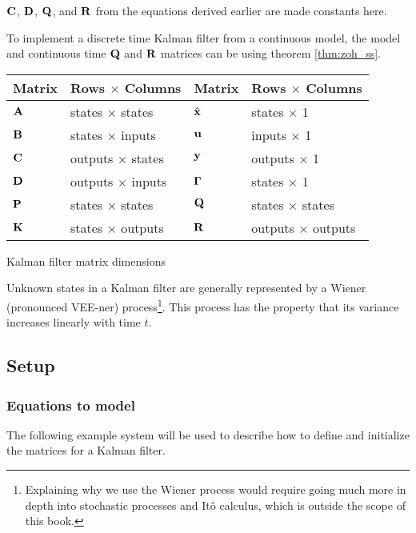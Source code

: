 $\mathbf{C}$, $\mathbf{D}$, $\mathbf{Q}$, and $\mathbf{R}$ from the equations derived
earlier are made constants here.
\begin{remark}
  To implement a discrete time Kalman filter from a continuous model, the model
  and continuous time $\mathbf{Q}$ and $\mathbf{R}$ matrices can be
   using theorem \ref{thm:zoh_ss}.
\end{remark}
\begin{booktable}
  \begin{tabular}{|ll|ll|}
    \hline
    \rowcolor{headingbg}
    \textbf{Matrix} & \textbf{Rows $\times$ Columns} &
    \textbf{Matrix} & \textbf{Rows $\times$ Columns} \\
    \hline
    $\mathbf{A}$ & states $\times$ states & $\hat{\mathbf{x}}$ & states $\times$ 1 \\
    $\mathbf{B}$ & states $\times$ inputs & $\mathbf{u}$ & inputs $\times$ 1 \\
    $\mathbf{C}$ & outputs $\times$ states & $\mathbf{y}$ & outputs $\times$ 1 \\
    $\mathbf{D}$ & outputs $\times$ inputs & $\mathbf{\Gamma}$ & states $\times$ 1 \\
    $\mathbf{P}$ & states $\times$ states & $\mathbf{Q}$ & states $\times$ states \\
    $\mathbf{K}$ & states $\times$ outputs & $\mathbf{R}$ & outputs $\times$ outputs
      \\
    \hline
  \end{tabular}
  \caption{Kalman filter matrix dimensions}
\end{booktable}

Unknown \glspl{state} in a Kalman filter are generally represented by a Wiener
(pronounced VEE-ner) process\footnote{Explaining why we use the Wiener process
would require going much more in depth into stochastic processes and It\^{o}
calculus, which is outside the scope of this book.}. This process has the
property that its variance increases linearly with time $t$.

\subsection{Setup}

\subsubsection{Equations to model}

The following example \gls{system} will be used to describe how to define and
initialize the matrices for a Kalman filter.

